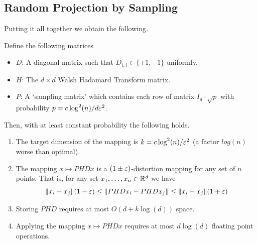 \documentclass{article}
\begin{document}
\subsection{Random Projection by Sampling}
Putting it all together we obtain the following.
\begin{lemma}
Define the following matrices
\begin{itemize}
\item $D$: A diagonal matrix such that $D_{i,i} \in \{+1,-1\}$ uniformly.
\item $H$: The $d\times d$ Walsh Hadamard Transform matrix.
\item $P$: A `sampling matrix' which contains each row of matrix $I_d\cdot \sqrt{p}$ with probability $p= c\log^2(n)/d\varepsilon^2$.
\end{itemize}
Then, with at least constant probability the following holds.
\begin{enumerate}
\item The target dimension of the mapping is $k = c\log^2(n)/\varepsilon^2$ (a factor $log(n)$ worse than optimal).
\item The mapping $x \mapsto PHDx$ is a $(1\pm\varepsilon)$-distortion mapping for any set of $n$ points. 
That is, for any set $x_1,\ldots,x_n \in {\mathbb{R}}^d$ we have
\[
\|x_i -x_j\|(1-\varepsilon) \le \|PHDx_i  - PHDx_j\| \le \|x_i -x_j\|(1+\varepsilon)
\]
\item Storing $PHD$ requires at most $O(d + k\log(d))$ space.
\item Applying the mapping $x \mapsto PHDx$ requires at most $d\log(d)$ floating point operations.
\end{enumerate}
\end{lemma}




\end{document}
